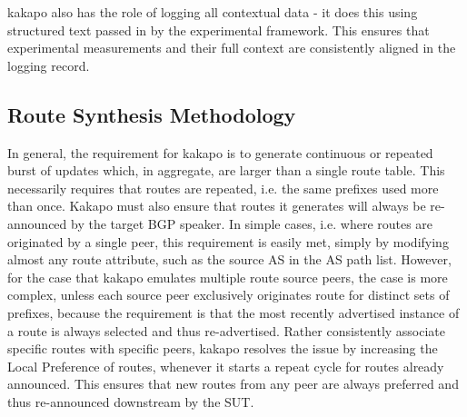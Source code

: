 kakapo also has the role of logging all contextual data - it does this using structured text passed in by the experimental framework.
This ensures that experimental measurements and their full context are consistently aligned in the logging record.


\subsection{Route Synthesis Methodology}

In general, the requirement for kakapo is to generate continuous or repeated burst of updates which, in aggregate, are larger than a single route table.
This necessarily requires that routes are repeated, i.e. the same prefixes used more than once.
Kakapo must also ensure that routes it generates will always be re-announced by the target BGP speaker.
In simple cases, i.e. where routes are originated by a single peer, this requirement is easily met, simply by modifying almost any route attribute, such as the source AS in the AS path list.
However, for the case that kakapo emulates multiple route source peers, the case is more complex, unless each source peer exclusively originates route for distinct sets of prefixes, because the requirement is that the most recently advertised instance of a route is always selected and thus re-advertised.
Rather consistently associate specific routes with specific peers, kakapo resolves the issue by increasing the Local Preference of routes, whenever it starts a repeat cycle for routes already announced.
This ensures that new routes from any peer are always preferred and thus re-announced downstream by the SUT.

